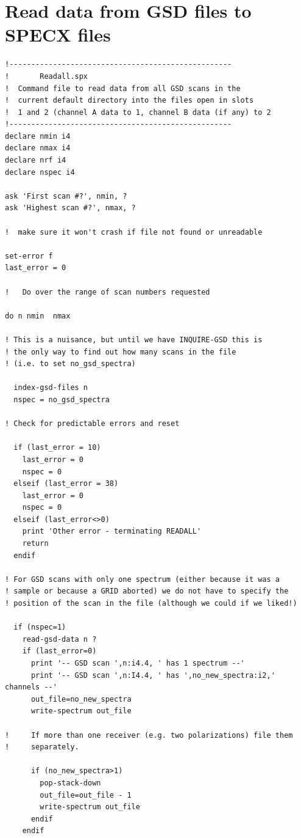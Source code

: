 \documentclass[11pt,twoside]{report}
\begin{document}
\newpage
\section{Read data from GSD files to SPECX files}

\begin{verbatim}
!---------------------------------------------------
!       Readall.spx
!  Command file to read data from all GSD scans in the
!  current default directory into the files open in slots
!  1 and 2 (channel A data to 1, channel B data (if any) to 2
!---------------------------------------------------
declare nmin i4
declare nmax i4
declare nrf i4
declare nspec i4

ask 'First scan #?', nmin, ?
ask 'Highest scan #?', nmax, ?

!  make sure it won't crash if file not found or unreadable

set-error f
last_error = 0

!   Do over the range of scan numbers requested

do n nmin  nmax

! This is a nuisance, but until we have INQUIRE-GSD this is
! the only way to find out how many scans in the file
! (i.e. to set no_gsd_spectra)

  index-gsd-files n
  nspec = no_gsd_spectra

! Check for predictable errors and reset

  if (last_error = 10) 
    last_error = 0
    nspec = 0
  elseif (last_error = 38)
    last_error = 0
    nspec = 0
  elseif (last_error<>0)
    print 'Other error - terminating READALL'
    return
  endif

! For GSD scans with only one spectrum (either because it was a
! sample or because a GRID aborted) we do not have to specify the
! position of the scan in the file (although we could if we liked!)

  if (nspec=1)
    read-gsd-data n ?
    if (last_error=0)
      print '-- GSD scan ',n:i4.4, ' has 1 spectrum --'
      print '-- GSD scan ',n:I4.4, ' has ',no_new_spectra:i2,' channels --'
      out_file=no_new_spectra
      write-spectrum out_file

!     If more than one receiver (e.g. two polarizations) file them
!     separately.

      if (no_new_spectra>1)
        pop-stack-down
        out_file=out_file - 1
        write-spectrum out_file
      endif
    endif


\end{verbatim}
\end{document}
